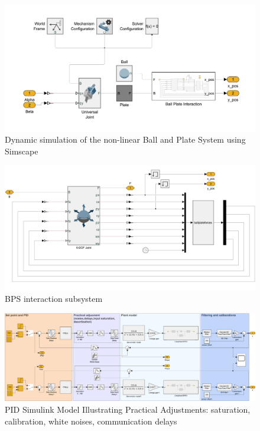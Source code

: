 \begin{figure}
\centering
\includegraphics[width=0.95\textheight]{Figures/chapter03/simscape.png}
\caption{Dynamic simulation of the non-linear Ball and Plate System using Simscape}
\label{fig:IMs matrix correlation}
\end{figure}

\begin{figure}
\centering
\includegraphics[width=0.95\textheight]{Figures/chapter03/BPinteration.png}
\caption{BPS interaction subsystem}
\label{fig:IMs matrix correlation}
\end{figure}

\begin{figure}
\centering
\includegraphics[width=0.95\textheight]{Figures/chapter04/practicalPID.png}
\caption{PID Simulink Model Illustrating Practical Adjustments: saturation, calibration, white noises, communication delays}
\label{fig:IMs matrix correlation}
\end{figure}

